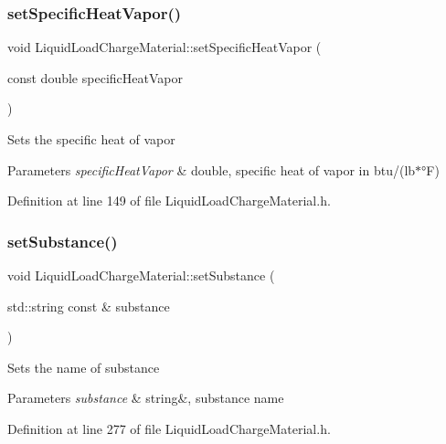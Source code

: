 \subsubsection{\texorpdfstring{set\+Specific\+Heat\+Vapor()}{setSpecificHeatVapor()}}
{\footnotesize\ttfamily void Liquid\+Load\+Charge\+Material\+::set\+Specific\+Heat\+Vapor (\begin{DoxyParamCaption}\item[{const double}]{specific\+Heat\+Vapor }\end{DoxyParamCaption})\hspace{0.3cm}{\ttfamily [inline]}}

Sets the specific heat of vapor 
\begin{DoxyParams}{Parameters}
{\em specific\+Heat\+Vapor} & double, specific heat of vapor in btu/(lb$\ast$°F) \\
\hline
\end{DoxyParams}


Definition at line 149 of file Liquid\+Load\+Charge\+Material.\+h.

\mbox{\label{class_liquid_load_charge_material_a85bb43270c6a11a1eaf51f00da16746a}} 
\subsubsection{\texorpdfstring{set\+Substance()}{setSubstance()}}
{\footnotesize\ttfamily void Liquid\+Load\+Charge\+Material\+::set\+Substance (\begin{DoxyParamCaption}\item[{std\+::string const \&}]{substance }\end{DoxyParamCaption})\hspace{0.3cm}{\ttfamily [inline]}}

Sets the name of substance 
\begin{DoxyParams}{Parameters}
{\em substance} & string\&, substance name \\
\hline
\end{DoxyParams}


Definition at line 277 of file Liquid\+Load\+Charge\+Material.\+h.

\mbox{\label{class_liquid_load_charge_material_a39c258d0bfdcfa352590d411a8c4e882}} 
